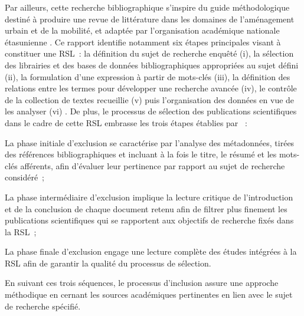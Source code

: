 \begin{refsegment}
Par ailleurs, cette recherche bibliographique s'inspire du guide méthodologique destiné à produire une revue de littérature dans les domaines de l'aménagement urbain et de la mobilité, et adaptée par l'organisation académique nationale étasunienne \textcolor{blue}{\textcite{transportation_research_board_of_the_national_academies_literature_2015}}. Ce rapport identifie notamment six étapes principales visant à constituer une \acrshort{RSL}~: la définition du sujet de recherche enquêté (i), la sélection des librairies et des bases de données bibliographiques appropriées au sujet défini (ii), la formulation d'une expression à partir de mots-clés (iii), la définition des relations entre les termes pour développer une recherche avancée (iv), le contrôle de la collection de textes recueillie (v) puis l'organisation des données en vue de les analyser (vi) \textcolor{blue}{\autocite[2-18]{transportation_research_board_of_the_national_academies_literature_2015}}. De plus, le processus de sélection des publications scientifiques dans le cadre de cette \acrshort{RSL} embrasse les trois étapes établies par \textcolor{blue}{\textcite[2~544]{jain_systematic_2020}}~:
    \begin{customitemize}
        \item La phase initiale d'exclusion se caractérise par l'analyse des métadonnées, tirées des références bibliographiques et incluant à la fois le titre, le résumé et les mots-clés afférents, afin d'évaluer leur pertinence par rapport au sujet de recherche considéré~;
        \item La phase intermédiaire d'exclusion implique la lecture critique de l'introduction et de la conclusion de chaque document retenu afin de filtrer plus finement les publications scientifiques qui se rapportent aux objectifs de recherche fixés dans la \acrshort{RSL}~;
        \item La phase finale d'exclusion engage une lecture complète des études intégrées à la \acrshort{RSL} afin de garantir la qualité du processus de sélection.
    \end{customitemize}
En suivant ces trois séquences, le processus d'inclusion assure une approche méthodique en cernant les sources académiques pertinentes en lien avec le sujet de recherche spécifié.%


\end{refsegment}
